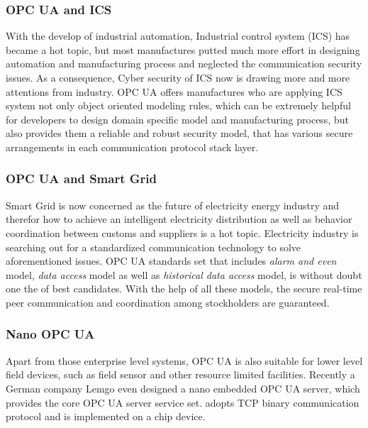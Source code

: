 \subsubsection{OPC UA and ICS}
With the develop of industrial automation, Industrial control system (ICS) has became a hot topic, but most manufactures putted much more effort in designing automation and manufacturing process and neglected the communication security issues. As a consequence, Cyber security of ICS now is drawing more and more attentions from industry. OPC UA offers manufactures who are applying ICS system not only object oriented modeling rules, which can be extremely helpful for developers to design domain specific model and manufacturing process, but also provides them a reliable and robust security model\cite{opc_ics}, that has various secure arrangements in each communication protocol stack layer.


\subsubsection{OPC UA and  Smart Grid}
Smart Grid is now concerned as the future of electricity energy industry and therefor how to achieve an intelligent electricity distribution as well as behavior coordination between customs and suppliers is a hot topic\cite{opc_grid}. Electricity industry is searching out for a standardized communication technology to solve aforementioned issues.
OPC UA standards set that includes \emph{alarm and even} model, \emph{data access} model as well as  \emph{historical data access} model, is without doubt one the of best candidates. With the help of all these models, the secure real-time peer communication and coordination among stockholders are guaranteed.

\subsubsection{Nano OPC UA }
Apart from those enterprise level systems, OPC UA is also suitable for lower level field devices, such as field sensor and other resource limited facilities. Recently a German company Lemgo even designed a nano embedded OPC UA server\cite{opc_lemgo}, which provides the core OPC UA server service set. adopts TCP binary communication protocol and is implemented on a chip device.

